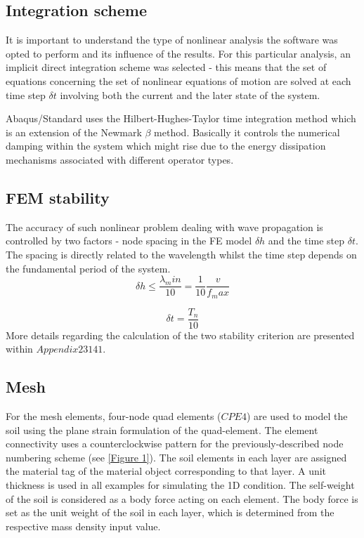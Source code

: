 \documentclass[10pt,a4paper]{report}
\begin{document}
\subsection{Integration scheme}
It is important to understand the type of nonlinear analysis the software was opted to perform and its influence of the results. For this particular analysis, an implicit direct integration scheme was selected - this means that the set of equations concerning the set of nonlinear equations of motion are solved at each time step $\delta t$ involving both the current and the later state of the system.

Abaqus/Standard uses the Hilbert-Hughes-Taylor time integration method which is an extension of the Newmark $\beta$ method. Basically it controls the numerical damping within the system which might rise due to the energy dissipation mechanisms associated with different operator types.
\subsection{FEM stability}
The accuracy of such nonlinear problem dealing with wave propagation is controlled by two factors - node spacing in the FE model $\delta h$ and the time step $\delta t$. The spacing is directly related to the wavelength whilst the time step depends on the fundamental period of the system. 
\begin{equation}
	\delta h\leq\frac{\lambda_min}{10}=\frac{1}{10} \frac{v}{f_max}
\end{equation}

\begin{equation}
	\delta t=\frac{T_n}{10}
\end{equation}
More details regarding the calculation of the two stability criterion are presented within $Appendix 23141$.

\subsection{Mesh}
For the mesh elements, four-node quad elements ($CPE4$) are used to model the soil using the plane strain formulation of the quad-element. The element connectivity uses a counterclockwise pattern for the previously-described node numbering scheme (see \ref{Figure 1}). The soil elements in each layer are assigned the material tag of the material object corresponding to that layer. A unit thickness is used in all examples for simulating the 1D condition. The self-weight of the soil is considered as a body force acting on each element. The body force is set as the unit weight of the soil in each layer, which is determined from the respective mass density input value.
\end{document}
